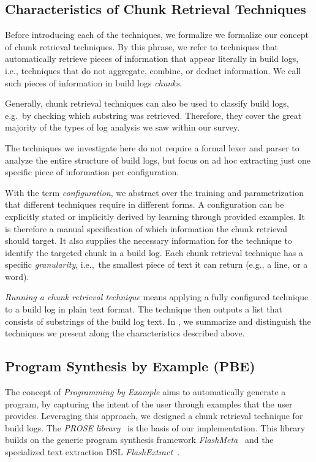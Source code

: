 \subsection{Characteristics of Chunk Retrieval Techniques}
\label{sec:crt-characteristics}
Before introducing each of the techniques, we formalize
we formalize our concept of chunk retrieval techniques.
By this phrase, we refer to techniques that automatically
retrieve pieces of information that appear literally in build
logs, i.e., techniques that do not aggregate, combine, or deduct
information.
We call such pieces of information in build logs
\emph{chunks}.

Generally, chunk retrieval techniques
can also be used to classify build logs, e.g.\ by checking
which substring was retrieved.
Therefore, they
cover the great majority of the types of log analysis we saw within
our survey.

The techniques we investigate here do not require a formal lexer and
parser to analyze the entire structure of build logs, but focus on
ad hoc extracting just one specific piece of information per
configuration.

With the term \textit{configuration}, we abstract over the training
and parametrization that different techniques require in different
forms.
A configuration can be explicitly stated or implicitly derived
by learning through provided examples.
It is therefore a manual
specification of which information the chunk retrieval should target.
It also supplies the necessary information for the technique to
identify the targeted chunk in a build log.
Each chunk
retrieval technique has a specific \textit{granularity}, i.e.,\ the
smallest piece of text it can return (e.g., a line, or a word).

\emph{Running a
chunk retrieval technique} means applying a fully configured
technique to a build log in plain text format.
The technique then outputs a list that consists of substrings of the
build log text.
In , we summarize and distinguish the techniques
we present along the characteristics described above.

\subsection{Program Synthesis by Example (PBE)}
The concept of \emph{Programming by Example} aims to automatically
generate a program, by capturing the
intent of the user through examples that the user provides.
Leveraging this approach, we designed a chunk retrieval technique
for build logs.
The \emph{PROSE library}~\cite{prose2019webpage} is the basis of
our implementation.
This library builds on the generic program synthesis framework
\emph{FlashMeta}~\cite{polozov2015flashmeta:} and the specialized
text extraction DSL \emph{FlashExtract}~\cite{le2014flashextract:}.

